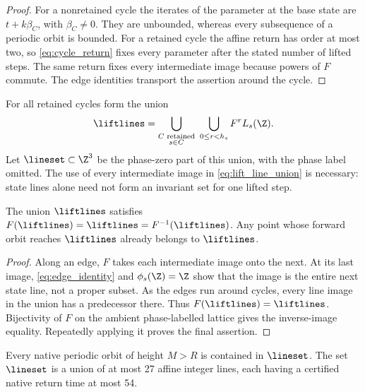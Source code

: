 \begin{proof}
For a nonretained cycle the iterates of the parameter at the base
state are \(t+k\beta_C\), with \(\beta_C\ne0\). They are unbounded,
whereas every subsequence of a periodic orbit is bounded. For a
retained cycle the affine return has order at most two, so
\eqref{eq:cycle_return} fixes every parameter after the stated number
of lifted steps. The same return fixes every intermediate image
because powers of \(F\) commute. The edge identities transport the
assertion around the cycle.
\end{proof}

For all retained cycles form the union
\begin{equation}\label{eq:lift_line_union}
 \liftlines=
 \bigcup_{\substack{C\text{ retained}\\s\in C}}
 \ \bigcup_{0\le r<h_s}F^rL_s(\Z).
\end{equation}
Let \(\lineset\subset\Z^3\) be the phase-zero part of this union,
with the phase label omitted. The use of every intermediate image in
\eqref{eq:lift_line_union} is necessary: state lines alone need not
form an invariant set for one lifted step.

\begin{lemma}\label{lem:backward}
The union \(\liftlines\) satisfies
\(F(\liftlines)=\liftlines=F^{-1}(\liftlines)\).
Any point whose forward orbit reaches \(\liftlines\) already belongs
to \(\liftlines\).
\end{lemma}

\begin{proof}
Along an edge, \(F\) takes each intermediate image onto the next.
At its last image, \eqref{eq:edge_identity} and
\(\phi_s(\Z)=\Z\) show that the image is the entire next state line,
not a proper subset. As the edges run around cycles, every line image
in the union has a predecessor there. Thus
\(F(\liftlines)=\liftlines\). Bijectivity of \(F\) on the ambient
phase-labelled lattice gives the inverse-image equality. Repeatedly
applying it proves the final assertion.
\end{proof}

\begin{proposition}\label{prop:exhaustion}
Every native periodic orbit of height \(M>R\) is contained in
\(\lineset\). The set \(\lineset\) is a union of at most 27 affine
integer lines, each having a certified native return time at most 54.
\end{proposition}

